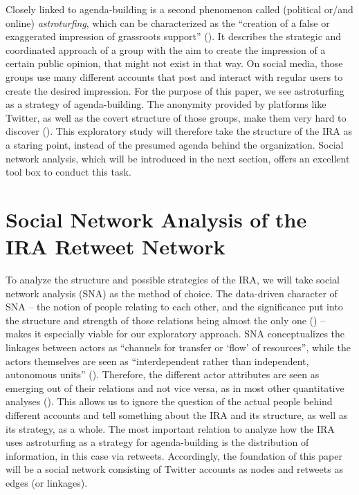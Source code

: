 \documentclass[12pt, titlepage=true, toc=bib]{scrartcl}
\begin{document}
Closely linked to agenda-building is a second phenomenon called (political or/and online) \textit{astroturfing}, which can be characterized as the ``creation of a false or exaggerated impression of grassroots support'' (\cite{harcup_astroturfing_2014}). It describes the strategic and coordinated approach of a group with the aim to create the impression of a certain public opinion, that might not exist in that way. On social media, those groups use many different accounts that post and interact with regular users to create the desired impression. For the purpose of this paper, we see astroturfing as a strategy of agenda-building. The anonymity provided by platforms like Twitter, as well as the covert structure of those groups, make them very hard to discover (\cite[564]{yang_how_2017}). This exploratory study will therefore take the structure of the IRA as a staring point, instead of the presumed agenda behind the organization. Social network analysis, which will be introduced in the next section, offers an excellent tool box to conduct this task.


\section{Social Network Analysis of the IRA Retweet Network}

To analyze the structure and possible strategies of the IRA, we will take social network analysis (SNA) as the method of choice. The data-driven character of SNA -- the notion of people relating to each other, and the significance put into the structure and strength of those relations being almost the only one (\cite[982]{golovchenko_state_2018}) -- makes it especially viable for our exploratory approach. SNA conceptualizes the linkages between actors as \enquote{channels for transfer or \enquote{flow} of resources}, while the actors themselves are seen as ``interdependent rather than independent, autonomous units'' (\cite[4]{wasserman_social_1994}). Therefore, the different actor attributes are seen as emerging out of their relations and not vice versa, as in most other quantitative analyses (\cite[8]{wasserman_social_1994}). This allows us to ignore the question of the actual people behind different accounts and tell something about the IRA and its structure, as well as its strategy, as a whole. The most important relation to analyze how the IRA uses astroturfing as a strategy for agenda-building is the distribution of information, in this case via retweets. Accordingly, the foundation of this paper will be a social network consisting of Twitter accounts as nodes and retweets as edges (or linkages).
\end{document}
